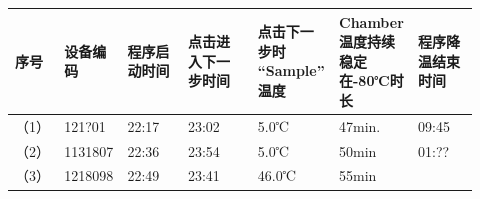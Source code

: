 \documentclass[UTF8,10pt,a4paper,fontset=fandol]{ctexart}
\newcommand{\fieldvalue}[1]{#1}
\newcommand{\handwritten}[1]{#1}
\begin{document}
\small
\begin{tabular}{|p{0.07\linewidth}|p{0.13\linewidth}|p{0.13\linewidth}|p{0.15\linewidth}|p{0.15\linewidth}|p{0.16\linewidth}|p{0.13\linewidth}|}
\hline
序号 & 设备编码 & 程序启动时间 & 点击进入下一步时间 & 点击下一步时 ``Sample'' 温度 & Chamber温度持续稳定在-80℃时长 & 程序降温结束时间 \\ \hline
（1） &
\fieldvalue{\handwritten{121?01}} &
\fieldvalue{\handwritten{22:17}} &
\fieldvalue{\handwritten{23:02}} &
\fieldvalue{\handwritten{5.0℃}} &
\fieldvalue{\handwritten{47min.}} &
\fieldvalue{\handwritten{09:45}}
\\ \hline
（2） &
\fieldvalue{\handwritten{1131807}} &
\fieldvalue{\handwritten{22:36}} &
\fieldvalue{\handwritten{23:54}} &
\fieldvalue{\handwritten{5.0℃}} &
\fieldvalue{\handwritten{50min}} &
\fieldvalue{\handwritten{01:??}}
\\ \hline
（3） &
\fieldvalue{\handwritten{1218098}} &
\fieldvalue{\handwritten{22:49}} &
\fieldvalue{\handwritten{23:41}} &
\fieldvalue{\handwritten{46.0℃}} &
\fieldvalue{\handwritten{55min}} &

\end{tabular}
\end{document}
